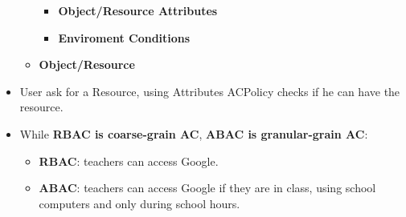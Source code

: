 \documentclass[9pt, letterpaper]{article}
\begin{document}
\begin{itemize}
\begin{itemize}
\begin{itemize}
\begin{itemize}
			                  \end{itemize}
			            \item \textbf{Object/Resource Attributes}
			            \item \textbf{Enviroment Conditions}
		            \end{itemize}
		      \item \textbf{Object/Resource}
	      \end{itemize}
	\item User ask for a Resource, using Attributes ACPolicy checks if he can have the resource.
	\item While \textbf{RBAC is coarse-grain AC}, \textbf{ABAC is granular-grain AC}:
	      \begin{itemize}
		      \item \textbf{RBAC}: teachers can access Google.
		      \item \textbf{ABAC}: teachers can access Google if they are in class, using school computers and only during school hours.
	      \end{itemize}
\end{itemize}

\newpage
\end{document}
